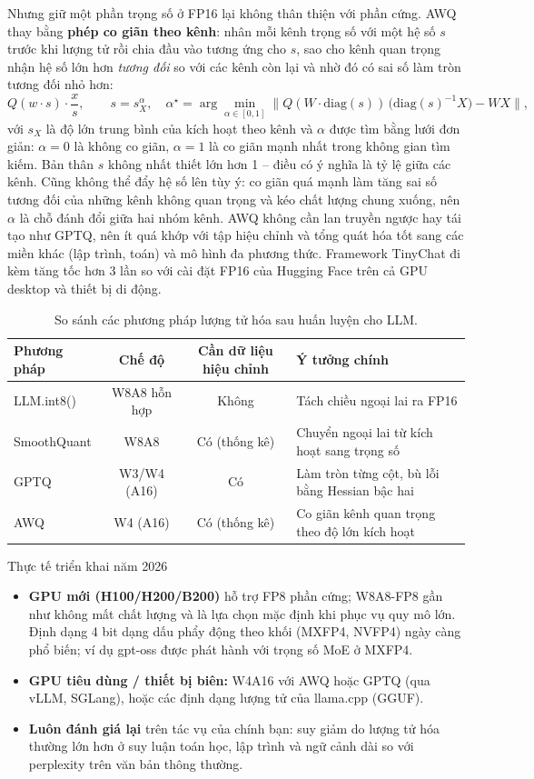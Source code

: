 Nhưng giữ một phần trọng số ở FP16 lại không thân thiện với phần cứng. AWQ thay bằng \textbf{phép co giãn theo kênh}: nhân mỗi kênh trọng số với một hệ số $s$ trước khi lượng tử rồi chia đầu vào tương ứng cho $s$, sao cho kênh quan trọng nhận hệ số lớn hơn \emph{tương đối} so với các kênh còn lại và nhờ đó có sai số làm tròn tương đối nhỏ hơn:
\[
Q(w \cdot s)\cdot \frac{x}{s}, \qquad s = s_X^{\alpha}, \quad \alpha^\star = \arg\min_{\alpha\in[0,1]} \Big\|Q(W\cdot \text{diag}(s))\,\big(\text{diag}(s)^{-1}X\big) - WX\Big\|,
\]
với $s_X$ là độ lớn trung bình của kích hoạt theo kênh và $\alpha$ được tìm bằng lưới đơn giản: $\alpha = 0$ là không co giãn, $\alpha = 1$ là co giãn mạnh nhất trong không gian tìm kiếm. Bản thân $s$ không nhất thiết lớn hơn 1 -- điều có ý nghĩa là tỷ lệ giữa các kênh. Cũng không thể đẩy hệ số lên tùy ý: co giãn quá mạnh làm tăng sai số tương đối của những kênh không quan trọng và kéo chất lượng chung xuống, nên $\alpha$ là chỗ đánh đổi giữa hai nhóm kênh. AWQ không cần lan truyền ngược hay tái tạo như GPTQ, nên ít quá khớp với tập hiệu chỉnh và tổng quát hóa tốt sang các miền khác (lập trình, toán) và mô hình đa phương thức. Framework TinyChat đi kèm tăng tốc hơn 3 lần so với cài đặt FP16 của Hugging Face trên cả GPU desktop và thiết bị di động.

\begin{table}[H]
\centering
\caption{So sánh các phương pháp lượng tử hóa sau huấn luyện cho LLM.}
\label{tab:llm_quant_comparison}
\begin{tabularx}{\textwidth}{@{}lccX@{}}
\toprule
\textbf{Phương pháp} & \textbf{Chế độ} & \textbf{Cần dữ liệu hiệu chỉnh} & \textbf{Ý tưởng chính} \\
\midrule
LLM.int8() & W8A8 hỗn hợp & Không & Tách chiều ngoại lai ra FP16 \\
SmoothQuant & W8A8 & Có (thống kê) & Chuyển ngoại lai từ kích hoạt sang trọng số \\
GPTQ & W3/W4 (A16) & Có & Làm tròn từng cột, bù lỗi bằng Hessian bậc hai \\
AWQ & W4 (A16) & Có (thống kê) & Co giãn kênh quan trọng theo độ lớn kích hoạt \\
\bottomrule
\end{tabularx}
\end{table}

\begin{deepdive}{Thực tế triển khai năm 2026}
\begin{itemize}
	\item \textbf{GPU mới (H100/H200/B200)} hỗ trợ FP8 phần cứng; W8A8-FP8 gần như không mất chất lượng và là lựa chọn mặc định khi phục vụ quy mô lớn. Định dạng 4 bit dạng dấu phẩy động theo khối (MXFP4, NVFP4) ngày càng phổ biến; ví dụ gpt-oss được phát hành với trọng số MoE ở MXFP4.
	\item \textbf{GPU tiêu dùng / thiết bị biên:} W4A16 với AWQ hoặc GPTQ (qua vLLM, SGLang), hoặc các định dạng lượng tử của llama.cpp (GGUF).
	\item \textbf{Luôn đánh giá lại} trên tác vụ của chính bạn: suy giảm do lượng tử hóa thường lớn hơn ở suy luận toán học, lập trình và ngữ cảnh dài so với perplexity trên văn bản thông thường.
\end{itemize}
\end{deepdive}
